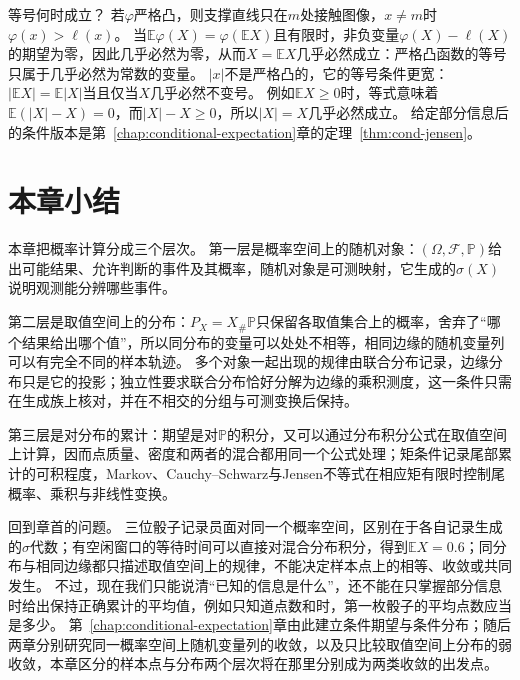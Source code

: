 等号何时成立？
若$\varphi$严格凸，则支撑直线只在$m$处接触图像，$x\ne m$时$\varphi(x)>\ell(x)$。
当$\mathbb E\varphi(X)=\varphi(\mathbb EX)$且有限时，非负变量$\varphi(X)-\ell(X)$的期望为零，因此几乎必然为零，从而$X=\mathbb EX$几乎必然成立：严格凸函数的等号只属于几乎必然为常数的变量。
$|x|$不是严格凸的，它的等号条件更宽：$|\mathbb EX|=\mathbb E|X|$当且仅当$X$几乎必然不变号。
例如$\mathbb EX\ge0$时，等式意味着$\mathbb E(|X|-X)=0$，而$|X|-X\ge0$，所以$|X|=X$几乎必然成立。
给定部分信息后的条件版本是第~\ref{chap:conditional-expectation}章的定理~\ref{thm:cond-jensen}。

\section{本章小结}
\label{sec:pmod-summary}

本章把概率计算分成三个层次。
第一层是概率空间上的随机对象：$(\Omega,\mathcal F,\mathbb P)$给出可能结果、允许判断的事件及其概率，随机对象是可测映射，它生成的$\sigma(X)$说明观测能分辨哪些事件。

第二层是取值空间上的分布：$P_X=X_\#\mathbb P$只保留各取值集合上的概率，舍弃了“哪个结果给出哪个值”，所以同分布的变量可以处处不相等，相同边缘的随机变量列可以有完全不同的样本轨迹。
多个对象一起出现的规律由联合分布记录，边缘分布只是它的投影；独立性要求联合分布恰好分解为边缘的乘积测度，这一条件只需在生成族上核对，并在不相交的分组与可测变换后保持。

第三层是对分布的累计：期望是对$\mathbb P$的积分，又可以通过分布积分公式在取值空间上计算，因而点质量、密度和两者的混合都用同一个公式处理；矩条件记录尾部累计的可积程度，Markov、Cauchy--Schwarz与Jensen不等式在相应矩有限时控制尾概率、乘积与非线性变换。

回到章首的问题。
三位骰子记录员面对同一个概率空间，区别在于各自记录生成的$\sigma$代数；有空闲窗口的等待时间可以直接对混合分布积分，得到$\mathbb EX=0.6$；同分布与相同边缘都只描述取值空间上的规律，不能决定样本点上的相等、收敛或共同发生。
不过，现在我们只能说清“已知的信息是什么”，还不能在只掌握部分信息时给出保持正确累计的平均值，例如只知道点数和时，第一枚骰子的平均点数应当是多少。
第~\ref{chap:conditional-expectation}章由此建立条件期望与条件分布；随后两章分别研究同一概率空间上随机变量列的收敛，以及只比较取值空间上分布的弱收敛，本章区分的样本点与分布两个层次将在那里分别成为两类收敛的出发点。
